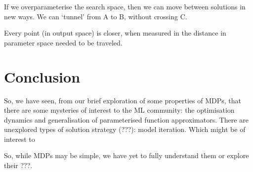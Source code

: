 If we overparameterise the search space, then we can move between solutions in new ways. We can `tunnel' from A to B, without crossing C.

Every point (in output space) is closer, when measured in the distance in parameter space needed to be traveled.

\section{Conclusion}

So, we have seen, from our brief exploration of some properties of MDPs, that
there are some mysteries of interest to the ML community: the optimisation dynamics and generalisation of
parameterised function approximators.
There are unexplored types of solution strategy (???): model iteration. Which might be of interest to

So, while MDPs may be simple, we have yet to fully understand them or explore their ???.
